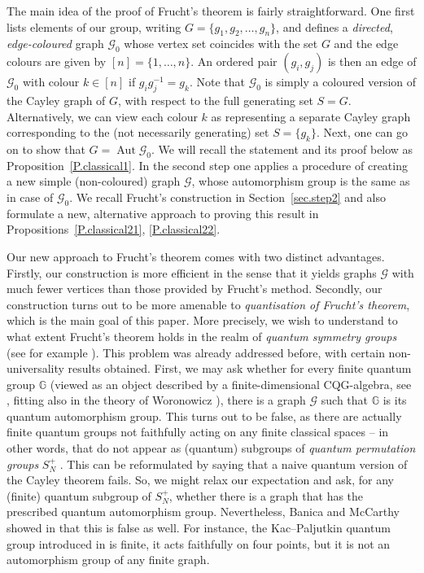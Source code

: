 \documentclass[12pt]{amsart}
\theoremstyle{definition}
\theoremstyle{definition}
\theoremstyle{definition}
\theoremstyle{definition}
\DeclareMathOperator{\Aut}{Aut}
\newcommand{\G}{\mathbb{G}}
\newcommand{\Gr}{\mathcal{G}}
\numberwithin{equation}{section}
\begin{document}
The main idea of the proof of Frucht's theorem is fairly straightforward. One first lists elements of our group, writing  $G = \{g_1, g_2, \ldots, g_n\}$, and defines a {\it directed}, {\it edge-coloured} graph $\Gr_0$ whose vertex set coincides with the set $G$ and the edge colours are given by $[n] = \{1, \ldots, n\}$. 
 An ordered pair $(g_i,g_j)$ is then an edge of $\Gr_0$ with colour $k \in [n]$ if $g_ig_j^{-1} = g_k$.  Note that $\Gr_0$ is simply a coloured version of the Cayley graph of $G$, with respect to the full generating set $S = G$. Alternatively, we can view each colour $k$ as representing a separate Cayley graph corresponding to the (not necessarily generating) set $S=\{g_k\}$. Next, one can go on to show that $G = \Aut\Gr_0$. We will recall the statement and its proof below as Proposition~\ref{P.classical1}.  In the second step one applies a procedure of creating a new simple (non-coloured) graph $\Gr$, whose automorphism group is the same as in case of $\Gr_0$. We recall Frucht's construction in Section~\ref{sec.step2} and also formulate a new,  alternative approach to proving this result in Propositions~\ref{P.classical21}, \ref{P.classical22}. 
 
 Our new approach to  Frucht's theorem comes with two distinct advantages.  Firstly, our construction is more efficient in the sense that it yields graphs $\Gr$ with much fewer vertices than those provided by Frucht's method.  Secondly, our construction turns out to be more amenable to {\it quantisation of Frucht's theorem}, which is the main goal of this paper.  More precisely, we wish to understand to what extent Frucht's theorem holds in the realm of {\it quantum symmetry groups} (see for example \cite{ASS17}).  
This problem was already addressed before, with certain non-universality results obtained. First, we may ask whether for every finite quantum group $\G$ (viewed as an object described by a finite-dimensional CQG-algebra, see \cite{DiK94}, fitting also in the theory of Woronowicz \cite{NT13}), there is a graph $\Gr$ such that $\G$ is its quantum automorphism group. This turns out to be false, as there are actually finite quantum groups not faithfully acting on any finite classical spaces -- in other words, that do not appear as (quantum) subgroups of \emph{quantum permutation groups} $S_N^+$ \cite{BBN12}. This can be reformulated by saying that a naive quantum version of the Cayley theorem fails. So, we might relax our expectation and ask, for any (finite) quantum subgroup of $S_N^+$, whether there is a graph that has the prescribed quantum automorphism group. Nevertheless, Banica and McCarthy showed in \cite{BM22} that this is false as well. For instance, the Kac--Paljutkin quantum group introduced in \cite{KP66} is finite, it acts faithfully on four points, but it is not an automorphism group of any finite graph.
\end{document}
